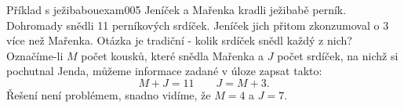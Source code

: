 \begin{mathexam}{Příklad s ježibabou}{exam005}
  Jeníček a Mařenka kradli ježibabě perník. Dohromady snědli \num{11} perníkových srdíček. Jeníček
  jich přitom zkonzumoval o \num{3} více než Mařenka. Otázka je tradiční - kolik srdíček snědl každý
  z nich? Označíme-li \(M\) počet kousků, které snědla Mařenka a \(J\) počet srdíček, na nichž si
  pochutnal Jenda, můžeme informace zadané v úloze zapsat takto:
    \begin{equation*}
      M + J = 11 \qquad J = M + 3.
    \end{equation*}
  Řešení není problémem, snadno vidíme, že \(M = 4\) a \(J = 7\).
\end{mathexam}